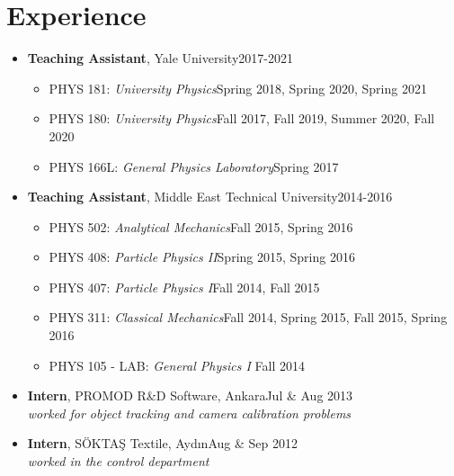 \documentclass[a4paper,11pt]{article}
\begin{document}
\section{\textcolor{burntorange}{Experience}}
\begin{itemize}[noitemsep,nolistsep] 
	\item[] \textbf{Teaching Assistant}, Yale University\hfill 2017-2021
	\vspace*{-.3em}
	\begin{itemize}
		\item[] PHYS 181: \emph{University Physics}\hfill Spring 2018, Spring 2020, Spring 2021\hspace*{2.2em}\vspace*{-.3em}
		\item[] PHYS 180: \emph{University Physics}\hfill Fall 2017, Fall 2019, Summer 2020, Fall 2020\hspace*{2.2em}\vspace*{-.3em}
		\item[] PHYS 166L: \emph{General Physics Laboratory}\hfill Spring 2017\hspace*{2.2em}\vspace*{-.3em}
	\end{itemize} 
	\item[] \textbf{Teaching Assistant}, Middle East Technical University\hfill 2014-2016
	\vspace*{-.3em}
	\begin{itemize}
	\item[] PHYS 502: \emph{Analytical Mechanics}\hfill Fall 2015, Spring 2016\hspace*{2.2em}\vspace*{-.3em}
	\item[] PHYS 408: \emph{Particle Physics II}\hfill Spring 2015, Spring 2016\hspace*{2.2em}\vspace*{-.3em}
	\item[] PHYS 407: \emph{Particle Physics I}\hfill Fall 2014, Fall 2015\hspace*{2.2em}\vspace*{-.3em}
	\item[] PHYS 311: \emph{Classical Mechanics}\hfill Fall 2014, Spring 2015, Fall 2015, Spring 2016\hspace*{2.2em}\vspace*{-.3em}
	\item[] PHYS 105 - LAB: \emph{General Physics I} \hfill Fall 2014\hspace*{2.2em}\vspace*{-.3em}
	\end{itemize} 
	\item[] \textbf{Intern}, PROMOD R\&D Software, Ankara\hfill Jul \& Aug 2013\\	\hspace*{1.8em}\emph{worked for object tracking and camera calibration problems}
\vspace*{-.3em}
	\item[] \textbf{Intern}, SÖKTAŞ Textile, Aydın\hfill Aug \& Sep 2012\\	\hspace*{1.8em}\emph{worked in the control department}
\end{itemize}
\end{document}
